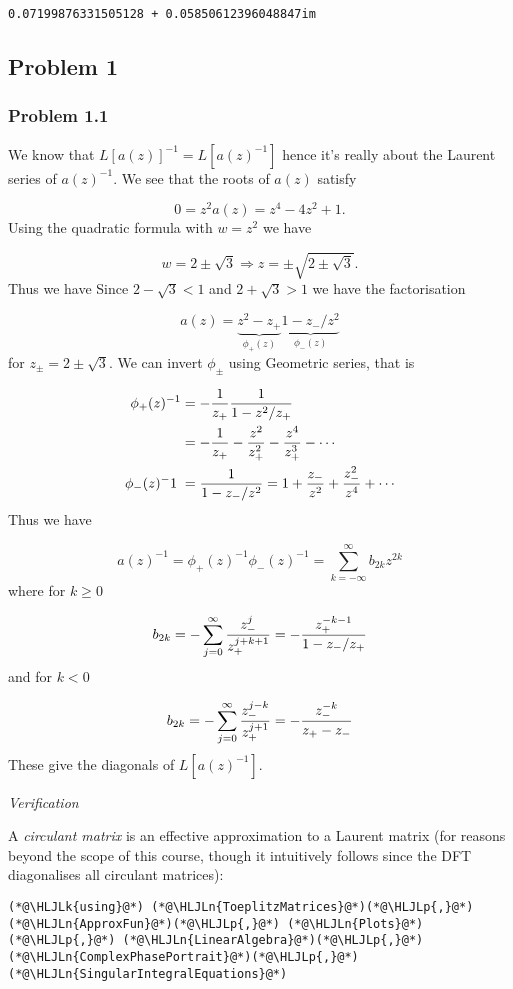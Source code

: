 \documentclass[12pt,landscape]{article}
\newcommand{\HLJLk}[1]{\textcolor[RGB]{148,91,176}{\textbf{#1}}}
\newcommand{\HLJLn}[1]{#1}
\newcommand{\HLJLp}[1]{#1}
\def\addtab#1={#1\;&=}
\def\ccr{\\\addtab}
\def\addtab#1={#1\;&=}
\def\ccr{\\\addtab}
\begin{document}
{\begin{lstlisting}
0.07199876331505128 + 0.05850612396048847im
\end{lstlisting}


\subsection{Problem 1}
\subsubsection{Problem 1.1}
We know that $L[a(z)]^{-1} = L[a(z)^{-1}]$ hence it's really about the Laurent series of $a(z)^{-1}$. We see that the roots of $a(z)$ satisfy

\[
0 =z^2 a(z) = z^4 - 4z^2 + 1.
\]
Using the quadratic formula with $w = z^2$ we have

\[
w = 2 \pm \sqrt 3 \Rightarrow z = \pm \sqrt{2 \pm \sqrt 3}.
\]
Thus we have Since $2 - \sqrt 3 < 1$ and $2 + \sqrt 3 > 1$ we have the factorisation

\[
a(z) = \underbrace{z^2 - z_+}_{\phi_+(z)} \underbrace{1 - z_-/z^2}_{\phi_-(z)}
\]
for $z_{\pm} = 2 \pm \sqrt3$. We can invert $\phi_\pm$ using Geometric series, that is


\begin{align*}
\phi_+(z)^{-1} &= -{1 \over z_+} {1 \over 1 - z^2/z_+}  \ccr
= -{1 \over z_+} - {z^2 \over z_+^2} - {z^4 \over z_+^3} - \cdots \ccr
\phi_-(z)^{-1} = {1 \over 1- z_- /z^2} = 1 + {z_- \over z^2} + {z_-^2 \over z^4} + \cdots
\end{align*}
Thus we have

\[
a(z)^{-1} = \phi_+(z)^{-1} \phi_-(z)^{-1} =  \sum_{k=-\infty}^\infty b_{2k} z^{2k}
\]
where for $k \geq 0$

\[
b_{2k} =- \sum_{j=0}^\infty {z_-^j \over z_+^{j+k+1}} = - {z_+^{-k-1} \over 1 - z_-/z_+}
\]
and for $k < 0$

\[
b_{2k} =- \sum_{j=0}^\infty {z_-^{j-k} \over z_+^{j+1}} = - {z_-^{-k} \over z_+ - z_-}
\]
These give the diagonals of $L[a(z)^{-1}]$.

\emph{Verification}

A \emph{circulant matrix} is an effective approximation to a Laurent matrix (for reasons beyond the scope of this course, though it intuitively follows since the DFT diagonalises all circulant matrices):


\begin{lstlisting}
(*@\HLJLk{using}@*) (*@\HLJLn{ToeplitzMatrices}@*)(*@\HLJLp{,}@*) (*@\HLJLn{ApproxFun}@*)(*@\HLJLp{,}@*) (*@\HLJLn{Plots}@*)(*@\HLJLp{,}@*) (*@\HLJLn{LinearAlgebra}@*)(*@\HLJLp{,}@*) (*@\HLJLn{ComplexPhasePortrait}@*)(*@\HLJLp{,}@*) (*@\HLJLn{SingularIntegralEquations}@*)


\end{lstlisting}}
\end{document}
